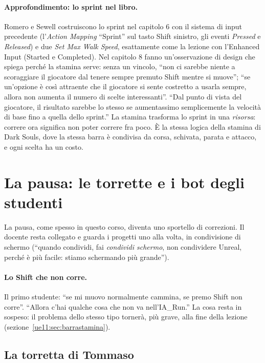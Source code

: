 \paragraph{Approfondimento: lo sprint nel libro.} Romero e Sewell costruiscono lo sprint nel
capitolo 6 con il sistema di input precedente (l'\emph{Action Mapping} ``Sprint'' sul
tasto Shift sinistro, gli eventi \emph{Pressed} e \emph{Released}) e due \emph{Set Max
Walk Speed}, esattamente come la lezione con l'Enhanced Input (Started e Completed). Nel
capitolo 8 fanno un'osservazione di design che spiega perché la stamina serve: senza un
vincolo, ``non ci sarebbe niente a scoraggiare il giocatore dal tenere sempre premuto
Shift mentre si muove''; ``se un'opzione è così attraente che il giocatore si sente
costretto a usarla sempre, allora non aumenta il numero di scelte interessanti''. ``Dal
punto di vista del giocatore, il risultato sarebbe lo stesso se aumentassimo semplicemente
la velocità di base fino a quella dello sprint.'' La stamina trasforma lo sprint in una
\emph{risorsa}: correre ora significa non poter correre fra poco. È la stessa logica della
stamina di Dark Souls, dove la stessa barra è condivisa da corsa, schivata, parata e
attacco, e ogni scelta ha un costo.

\section{La pausa: le torrette e i bot degli studenti}
\label{ue11:sec:pausa}

La pausa, come spesso in questo corso, diventa uno sportello di correzioni. Il docente
resta collegato e guarda i progetti uno alla volta, in condivisione di schermo
(``quando condividi, fai \emph{condividi schermo}, non condividere Unreal, perché è più
facile: stiamo schermando più grande'').

\paragraph{Lo Shift che non corre.} Il primo studente: ``se mi muovo normalmente cammina,
se premo Shift non corre''. ``Allora c'hai qualche cosa che non va nell'IA\_Run.'' La cosa
resta in sospeso: il problema dello stesso tipo tornerà, più grave, alla fine della lezione
(sezione~\ref{ue11:sec:barrastamina}).

\subsection{La torretta di Tommaso}

